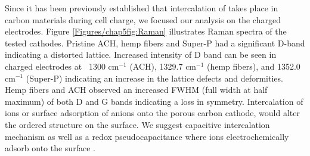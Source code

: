 Since it has been previously established that intercalation of  takes place in carbon materials during cell charge, we focused our analysis on the charged electrodes. Figure \ref{Figures/chap5fig:Raman} illustrates Raman spectra of the tested cathodes. Pristine ACH, hemp fibers and Super-P had a significant D-band indicating a distorted lattice. Increased intensity of D band can be seen in charged electrodes at ~1300 cm$^{-1}$ (ACH), 1329.7 cm$^{-1}$ (hemp fibers), and 1352.0 cm$^{-1}$ (Super-P) indicating an increase in the lattice defects and deformities. Hemp fibers and ACH observed an increased FWHM (full width at half maximum) of both D and G bands indicating a loss in symmetry. Intercalation of ions or surface adsorption of anions onto the porous carbon cathode, would alter the ordered structure on the surface. We suggest capacitive intercalation mechanism as well as a redox pseudocapacitance where  ions electrochemically adsorb onto the surface \cite{brezesinski_ordered_2010}. 
